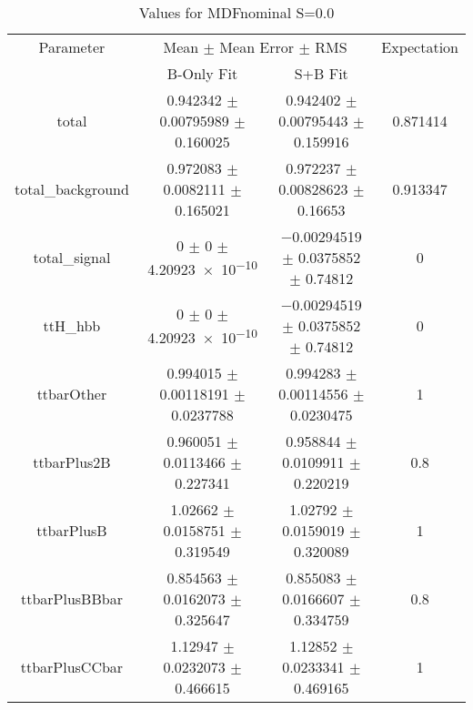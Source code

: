 \begin{table}
\centering
\caption{Values for MDFnominal S=0.0}
\begin{tabular}{cccc}
\toprule
Parameter & \multicolumn{2}{c}{Mean $\pm$ Mean Error $\pm$ RMS} & Expectation\\
 & B-Only Fit & S+B Fit & \\
\midrule
total & \num{0.942342} $\pm$ \num{0.00795989} $\pm$ \num{0.160025} & \num{0.942402} $\pm$ \num{0.00795443} $\pm$ \num{0.159916} & \num{0.871414}\\
total\_background & \num{0.972083} $\pm$ \num{0.0082111} $\pm$ \num{0.165021} & \num{0.972237} $\pm$ \num{0.00828623} $\pm$ \num{0.16653} & \num{0.913347}\\
total\_signal & \num{0} $\pm$ \num{0} $\pm$ \num{4.20923e-10} & \num{-0.00294519} $\pm$ \num{0.0375852} $\pm$ \num{0.74812} & \num{0}\\
ttH\_hbb & \num{0} $\pm$ \num{0} $\pm$ \num{4.20923e-10} & \num{-0.00294519} $\pm$ \num{0.0375852} $\pm$ \num{0.74812} & \num{0}\\
ttbarOther & \num{0.994015} $\pm$ \num{0.00118191} $\pm$ \num{0.0237788} & \num{0.994283} $\pm$ \num{0.00114556} $\pm$ \num{0.0230475} & \num{1}\\
ttbarPlus2B & \num{0.960051} $\pm$ \num{0.0113466} $\pm$ \num{0.227341} & \num{0.958844} $\pm$ \num{0.0109911} $\pm$ \num{0.220219} & \num{0.8}\\
ttbarPlusB & \num{1.02662} $\pm$ \num{0.0158751} $\pm$ \num{0.319549} & \num{1.02792} $\pm$ \num{0.0159019} $\pm$ \num{0.320089} & \num{1}\\
ttbarPlusBBbar & \num{0.854563} $\pm$ \num{0.0162073} $\pm$ \num{0.325647} & \num{0.855083} $\pm$ \num{0.0166607} $\pm$ \num{0.334759} & \num{0.8}\\
ttbarPlusCCbar & \num{1.12947} $\pm$ \num{0.0232073} $\pm$ \num{0.466615} & \num{1.12852} $\pm$ \num{0.0233341} $\pm$ \num{0.469165} & \num{1}\\
\bottomrule
\end{tabular}
\end{table}